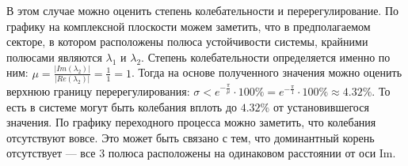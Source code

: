 \documentclass[a4paper]{article}
\begin{document}
В этом случае можно оценить степень колебательности и перерегулирование. По графику на комплексной плоскости можем заметить, что в предполагаемом секторе, в котором расположены полюса устойчивости системы, крайними полюсами являются $\lambda_1$ и $\lambda_2$. Степень колебательности определяется именно по ним: $\mu=\frac{|Im(\lambda_{2})|}{|Re(\lambda_{2})|}=\frac{1}{1}=1$. Тогда на основе полученного значения можно оценить верхнюю границу перерегулирования: $\sigma < e^{-\frac{\pi}{\mu}} \cdot 100\%= e^{-\frac{\pi}{1}} \cdot 100\% \approx 4.32 \%$. То есть в системе могут быть колебания вплоть до $4.32\%$ от установившегося значения. По графику переходного процесса можно заметить, что колебания отсутствуют вовсе. Это может быть связано с тем, что доминантный корень отсутствует --- все 3 полюса расположены на одинаковом расстоянии от оси $\text{Im}$.
\end{document}
